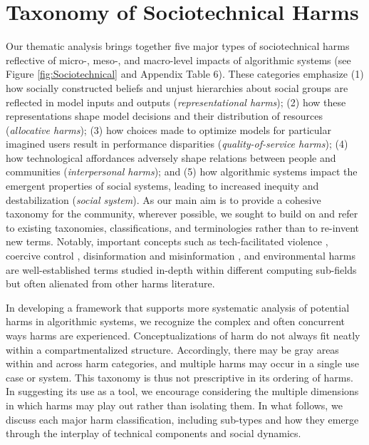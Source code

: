 \section{Taxonomy of Sociotechnical Harms}
\label{findings}
Our thematic analysis brings together five major types of sociotechnical harms reflective of micro-, meso-, and macro-level impacts of algorithmic systems (see Figure \ref{fig:Sociotechnical} and Appendix Table 6). These categories emphasize (1) how socially constructed beliefs and unjust hierarchies about social groups are reflected in model inputs and outputs (\textit{representational harms}); (2) how these representations shape model decisions and their distribution of resources (\textit{allocative harms}); (3) how choices made to optimize models for particular imagined users result in performance disparities (\textit{quality-of-service harms}); (4) how technological affordances adversely shape relations between people and communities (\textit{interpersonal harms}); and (5) how algorithmic systems impact the emergent properties of social systems, leading to increased inequity and destabilization (\textit{social system}). As our main aim is to provide a cohesive taxonomy for the community, wherever possible, we sought to build on and refer to existing taxonomies, classifications, and terminologies rather than to re-invent new terms. Notably, important concepts such as tech-facilitated violence \cite{henry2018technology, McGlynn_Rackley_2017}, coercive control \cite{Dragiewicz_2018}, disinformation and misinformation \cite{Wardle_and_Derakhshan_2017}, and environmental harms \cite{Bedford_Mann_Foth_Walters_2022} are well-established terms studied in-depth within different computing sub-fields but often alienated from other harms literature. 

In developing a framework that supports more systematic analysis of potential harms in algorithmic systems, we recognize the complex and often concurrent ways harms are experienced. Conceptualizations of harm do not always fit neatly within a compartmentalized structure. Accordingly, there may be gray areas within and across harm categories, and multiple harms may occur in a single use case or system. This taxonomy is thus not prescriptive in its ordering of harms. In suggesting its use as a tool, we encourage considering the multiple dimensions in which harms may play out rather than isolating them. In what follows, we discuss each major harm classification, including sub-types and how they emerge through the interplay of technical components and social dynamics. 

